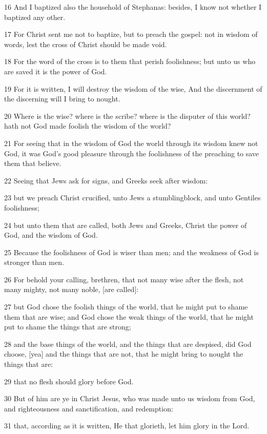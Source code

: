 \par 16 And I baptized also the household of Stephanas: besides, I know not whether I baptized any other.
\par 17 For Christ sent me not to baptize, but to preach the gospel: not in wisdom of words, lest the cross of Christ should be made void.
\par 18 For the word of the cross is to them that perish foolishness; but unto us who are saved it is the power of God.
\par 19 For it is written, I will destroy the wisdom of the wise, And the discernment of the discerning will I bring to nought.
\par 20 Where is the wise? where is the scribe? where is the disputer of this world? hath not God made foolish the wisdom of the world?
\par 21 For seeing that in the wisdom of God the world through its wisdom knew not God, it was God's good pleasure through the foolishness of the preaching to save them that believe.
\par 22 Seeing that Jews ask for signs, and Greeks seek after wisdom:
\par 23 but we preach Christ crucified, unto Jews a stumblingblock, and unto Gentiles foolishness;
\par 24 but unto them that are called, both Jews and Greeks, Christ the power of God, and the wisdom of God.
\par 25 Because the foolishness of God is wiser than men; and the weakness of God is stronger than men.
\par 26 For behold your calling, brethren, that not many wise after the flesh, not many mighty, not many noble, [are called]:
\par 27 but God chose the foolish things of the world, that he might put to shame them that are wise; and God chose the weak things of the world, that he might put to shame the things that are strong;
\par 28 and the base things of the world, and the things that are despised, did God choose, [yea] and the things that are not, that he might bring to nought the things that are:
\par 29 that no flesh should glory before God.
\par 30 But of him are ye in Christ Jesus, who was made unto us wisdom from God, and righteousness and sanctification, and redemption:
\par 31 that, according as it is written, He that glorieth, let him glory in the Lord.

